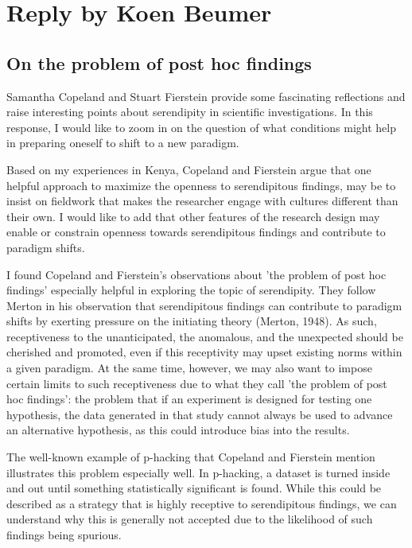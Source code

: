\documentclass[authordate, empirical]{jote-new-article}
\begin{document}
	\section{Reply by Koen Beumer}



	\subsection{On the problem of post hoc findings}



	Samantha Copeland and Stuart Fierstein provide some fascinating reflections and raise interesting points about serendipity in scientific investigations. In this response, I would like to zoom in on the question of what conditions might help in preparing oneself to shift to a new paradigm.



	Based on my experiences in Kenya, Copeland and Fierstein argue that one helpful approach to maximize the openness to serendipitous findings, may be to insist on fieldwork that makes the researcher engage with cultures different than their own. I would like to add that other features of the research design may enable or constrain openness towards serendipitous findings and contribute to paradigm shifts.



	I found Copeland and Fierstein's observations about 'the problem of post hoc findings' especially helpful in exploring the topic of serendipity. They follow Merton in his observation that serendipitous findings can contribute to paradigm shifts by exerting pressure on the initiating theory (Merton, 1948). As such, receptiveness to the unanticipated, the anomalous, and the unexpected should be cherished and promoted, even if this receptivity may upset existing norms within a given paradigm. At the same time, however, we may also want to impose certain limits to such receptiveness due to what they call 'the problem of post hoc findings': the problem that if an experiment is designed for testing one hypothesis, the data generated in that study cannot always be used to advance an alternative hypothesis, as this could introduce bias into the results.



	The well-known example of p-hacking that Copeland and Fierstein mention illustrates this problem especially well. In p-hacking, a dataset is turned inside and out until something statistically significant is found. While this could be described as a strategy that is highly receptive to serendipitous findings, we can understand why this is generally not accepted due to the likelihood of such findings being spurious.
\end{document}

